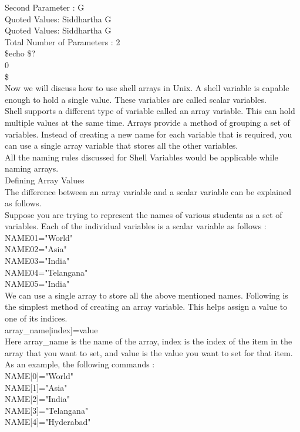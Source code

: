 \documentclass{article}
\begin{document}
Second Parameter : G\\
Quoted Values: Siddhartha G\\
Quoted Values: Siddhartha G\\
Total Number of Parameters : 2\\
\$echo \$?\\
0\\
\$\\
Now we will discuss how to use shell arrays in Unix. A shell variable is capable enough to hold a single value. These variables are called scalar variables.\\
Shell supports a different type of variable called an array variable. This can hold multiple values at the same time. Arrays provide a method of grouping a set of variables. Instead of creating a new name for each variable that is required, you can use a single array variable that stores all the other variables.\\
All the naming rules discussed for Shell Variables would be applicable while naming arrays.\\
Defining Array Values\\
The difference between an array variable and a scalar variable can be explained as follows.\\
Suppose you are trying to represent the names of various students as a set of variables. Each of the individual variables is a scalar variable as follows :\\
NAME01="World"\\
NAME02="Asia"\\
NAME03="India"\\
NAME04="Telangana"\\
NAME05="India"\\
We can use a single array to store all the above mentioned names. Following is the simplest method of creating an array variable. This helps assign a value to one of its indices.\\
array\_name[index]=value\\
Here array\_name is the name of the array, index is the index of the item in the array that you want to set, and value is the value you want to set for that item.
As an example, the following commands :\\
NAME[0]="World"\\
NAME[1]="Asia"\\
NAME[2]="India"\\
NAME[3]="Telangana"\\
NAME[4]="Hyderabad"\\
\end{document}
